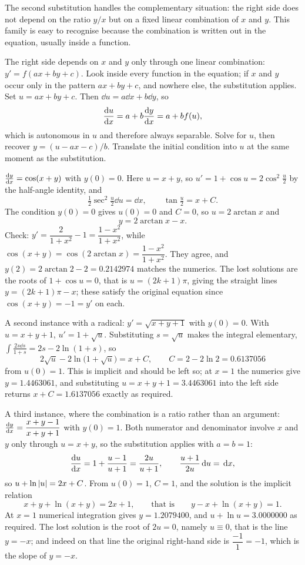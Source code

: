 The second substitution handles the complementary situation: the right side does not depend on the ratio $y/x$ but on a fixed linear combination of $x$ and $y$. This family is easy to recognise because the combination is written out in the equation, usually inside a function.

\cue The right side depends on $x$ and $y$ only through one linear combination: $y'=f(ax+by+c)$. Look inside every function in the equation; if $x$ and $y$ occur only in the pattern $ax+by+c$, and nowhere else, the substitution applies.
\method Set $u=ax+by+c$. Then $\dd u=a\dd x+b\dd y$, so
\[\frac{\mathrm{d}u}{\mathrm{d}x}=a+b\frac{\mathrm{d}y}{\mathrm{d}x}=a+bf(u),\]
which is autonomous in $u$ and therefore always separable. Solve for $u$, then recover $y=(u-ax-c)/b$. Translate the initial condition into $u$ at the same moment as the substitution.

\begin{worked}
$\frac{\mathrm{d}y}{\mathrm{d}x}=\cos(x+y)$ with $y(0)=0$. Here $u=x+y$, so $u'=1+\cos u=2\cos^{2}\tfrac u2$ by the half-angle identity, and
\[\tfrac12\sec^{2}\tfrac u2\dd u=\dd x,\qquad \tan\tfrac u2=x+C.\]
The condition $y(0)=0$ gives $u(0)=0$ and $C=0$, so $u=2\arctan x$ and
\[y=2\arctan x-x.\]
Check: $y'=\dfrac{2}{1+x^{2}}-1=\dfrac{1-x^{2}}{1+x^{2}}$, while $\cos(x+y)=\cos(2\arctan x)=\dfrac{1-x^{2}}{1+x^{2}}$. They agree, and $y(2)=2\arctan2-2=0.2142974$ matches the numerics. The lost solutions are the roots of $1+\cos u=0$, that is $u=(2k+1)\pi$, giving the straight lines $y=(2k+1)\pi-x$; these satisfy the original equation since $\cos(x+y)=-1=y'$ on each.

A second instance with a radical: $y'=\sqrt{x+y+1}$ with $y(0)=0$. With $u=x+y+1$, $u'=1+\sqrt u$. Substituting $s=\sqrt u$ makes the integral elementary, $\displaystyle\int\frac{2s\dd s}{1+s}=2s-2\ln(1+s)$, so
\[2\sqrt{u}-2\ln\bigl(1+\sqrt u\bigr)=x+C,\qquad C=2-2\ln2=0.6137056\]
from $u(0)=1$. This is implicit and should be left so; at $x=1$ the numerics give $y=1.4463061$, and substituting $u=x+y+1=3.4463061$ into the left side returns $x+C=1.6137056$ exactly as required.
\end{worked}

A third instance, where the combination is a ratio rather than an argument: $\frac{\mathrm{d}y}{\mathrm{d}x}=\dfrac{x+y-1}{x+y+1}$ with $y(0)=1$. Both numerator and denominator involve $x$ and $y$ only through $u=x+y$, so the substitution applies with $a=b=1$:
\[\frac{\mathrm{d}u}{\mathrm{d}x}=1+\frac{u-1}{u+1}=\frac{2u}{u+1},\qquad \frac{u+1}{2u}\,\mathrm{d} u=\,\mathrm{d} x,\]
so $u+\ln\left\lvert u\right\rvert=2x+C$. From $u(0)=1$, $C=1$, and the solution is the implicit relation
\[x+y+\ln(x+y)=2x+1,\qquad\text{that is}\qquad y-x+\ln(x+y)=1.\]
At $x=1$ numerical integration gives $y=1.2079400$, and $u+\ln u=3.0000000$ as required. The lost solution is the root of $2u=0$, namely $u\equiv0$, that is the line $y=-x$; and indeed on that line the original right-hand side is $\dfrac{-1}{1}=-1$, which is the slope of $y=-x$.

